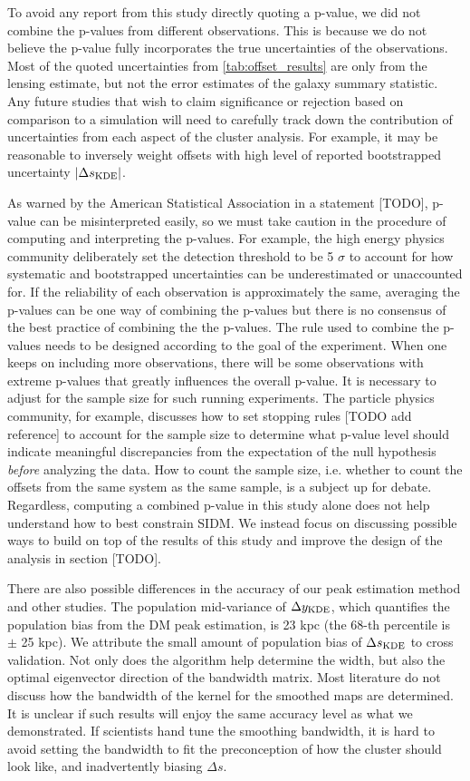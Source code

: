 To avoid any report from this study directly quoting a p-value, we did not
combine the p-values from different observations. 
This is because we do not believe the p-value fully
incorporates the true uncertainties of the observations. 
Most of the quoted uncertainties from \ref{tab:offset_results} are only 
from the lensing estimate, but not the error estimates of the galaxy summary 
statistic. 
Any future studies that wish to claim significance or rejection based on
comparison to a simulation will 
need to carefully track down the contribution of uncertainties from each aspect
of the cluster analysis.  
For example, it may be reasonable to inversely weight offsets with high level 
of reported bootstrapped uncertainty $|\Delta s_{\rm KDE}|$.

As warned by the American Statistical Association in a statement [TODO],
p-value can be misinterpreted easily, so
we must take caution in the procedure of computing and interpreting the p-values. 
For example, the high energy physics community deliberately set the detection
threshold to be 5 $\sigma$ to account for how systematic and bootstrapped uncertainties can be
underestimated or unaccounted for. 
If the reliability of each observation is 
approximately the same, averaging the p-values can be one way of combining the p-values 
but there is no consensus of the best practice of combining the the
p-values. The rule used to combine the p-values 
needs to be designed according to the goal of the experiment.
When one keeps on including more observations,  
there will be some observations with extreme p-values that greatly influences the
overall p-value. It is necessary to adjust for the sample size for such running
experiments.   
The particle physics community,
for example, discusses how to set stopping rules [TODO add reference]
to account for the sample size to determine what p-value level should indicate meaningful
discrepancies from the expectation of the null hypothesis {\it before}
analyzing the data. 
How to count the sample size, i.e. whether to count the offsets from the same
system as the same sample, is a subject up for debate.
Regardless, computing a combined p-value in this study alone does not help 
understand how to best constrain SIDM.
We instead focus on discussing possible ways to build on top of the results
of this study and improve the design of the 
analysis in section [TODO]. 

There are also possible differences in the accuracy of our peak
estimation method and other studies. 
The population mid-variance of $\Delta y_{\rm KDE}$, which quantifies the
population bias from the DM peak estimation, is 23 kpc (the 68-th percentile is
$\pm$ 25 kpc).
We attribute the small amount of population bias of $\Delta s_{\rm KDE}$ 
to cross validation. Not only does the algorithm help
determine the width, but also the optimal eigenvector direction of 
the bandwidth matrix. 
Most literature do not discuss how the bandwidth of 
the kernel for the smoothed maps are determined.  
It is unclear if such results will enjoy the same accuracy level as what
we demonstrated. 
If scientists hand tune the smoothing bandwidth, it is hard to
avoid setting the bandwidth to fit the preconception of how the cluster 
should look like, and inadvertently biasing $\Delta s$.

